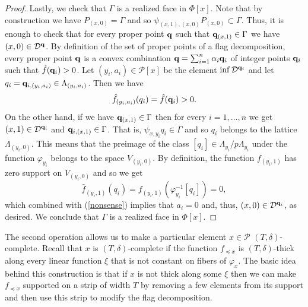 \documentclass{daj}
\newcommand{\D}{\mathcal D}
\renewcommand{\P}{\mathcal P}
\theoremstyle{definition}
\theoremstyle{remark}
\theoremstyle{definition}
\theoremstyle{definition}
\begin{document}
\begin{proof}
Lastly, we check that $\Gamma$ is a realized face in $\Phi[x]$. Note that by construction we have $P_{(x, 0)} = \Gamma$ and so $\psi_{(x, 1), (x, 0)} P_{(x, 0)} \subset \Gamma$. Thus, it is enough to check that for every proper point ${\bf q}$ such that ${\bf q}_{(x, 1)} \in \Gamma$ we have $(x, 0) \in \D^{\bf q}$. By definition of the set of proper points of a flag decomposition, every proper point ${\bf q}$ is a convex combination ${\bf q} = \sum_{i=1}^n \alpha_i {\bf q}_i$
of integer points ${\bf q}_i$ such that $\hat f({\bf q}_i) > 0$. Let $(y_i, a_i) \in \P[x]$ be the element $\inf \D^{{\bf q}_i}$ and let $q_i = {\bf q}_{i,(y_i,a_i)} \in \Lambda_{(y_i, a_i)}$. Then we have 
\begin{equation}\label{nonsense}
\hat f_{(y_i, a_i)}(q_i) =\hat f({\bf q}_i) >0.
\end{equation}
On the other hand, if we have ${\bf q}_{(x,1)} \in \Gamma$ then for every $i=1, \ldots, n$ we get $(x,1) \in \D^{{\bf q}_i}$ and ${\bf q}_{i, (x, 1)} \in \Gamma$. That is, $\psi_{x, y_i}q_i \in \Gamma$ and so $q_i$ belongs to the lattice $\Lambda_{(y_i, 0)}$. This means that the preimage of the class $[q_i] \in \Lambda_{y_i} / p\Lambda_{y_i}$ under the function $\varphi_{y_i}$ belongs to the space $V_{(y_i, 0)}$. By definition, the function $f_{(y_i, 1)}$ has zero support on $V_{(y_i, 0)}$ and so we get 
$$
\hat f_{(y_i, 1)}(q_i) = f_{(y_i, 1)}(\varphi_{y_i}^{-1}[q_i]) = 0,
$$
which combined with (\ref{nonsense}) implies that $a_i = 0$ and, thus, $(x, 0) \in \D^{{\bf q}_i}$, as desired. We conclude that $\Gamma$ is a realized face in $\Phi[x]$.
\end{proof}


The second operation allows us to make a particular element $x\in \P$ $(T, \delta)$-complete. Recall that $x$ is $(T, \delta)$-complete if the function $f_{\preceq x}$ is $(T, \delta)$-thick along every linear function $\xi$ that is not constant on fibers of $\varphi_x$.
The basic idea behind this construction is that if $x$ is not thick along some $\xi$ then we can make $f_{\preceq x}$ supported on a strip of width $T$ by removing a few elements from its support and then use this strip to modify the flag decomposition.
\end{document}
